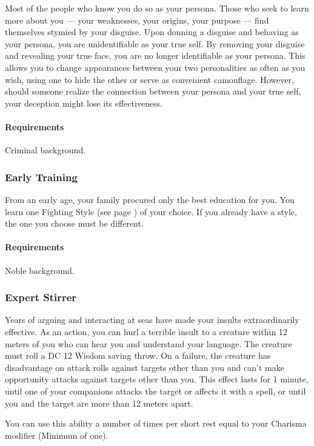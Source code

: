     Most of the people who know you do so as your persona.
    Those who seek to learn more about you --- your weaknesses, your origins, your purpose --- find themselves stymied by your disguise.
    Upon donning a disguise and behaving as your persona, you are unidentifiable as your true self.
    By removing your disguise and revealing your true face, you are no longer identifiable as your persona.
    This allows you to change appearances between your two personalities as often as you wish, using one to hide the other or serve as convenient camouflage.
    However, should someone realize the connection between your persona and your true self, your deception might lose its effectiveness.
    \paragraph{Requirements} Criminal background.
\subsubsection{Early Training} \label{feat::earlytraining}
    From an early age, your family procured only the best education for you.
    You learn one Fighting Style (see page \pageref{ssec::fightingstyles}) of your choice.
    If you already have a style, the one you choose must be different.
    \paragraph{Requirements} Noble background.
\subsubsection{Expert Stirrer} \label{feat::expertstirrer}
    Years of arguing and interacting at seas have made your insults extraordinarily effective.
    As an action, you can hurl a terrible insult to a creature within 12 meters of you who can hear you and understand your language.
    The creature must roll a DC 12 Wisdom saving throw.
    On a failure, the creature has disadvantage on attack rolls against targets other than you and can't make opportunity attacks against targets other than you.
    This effect lasts for 1 minute, until one of your companions attacks the target or affects it with a spell, or until you and the target are more than 12 meters apart.

    You can use this ability a number of times per short rest equal to your Charisma modifier (Minimum of one).

